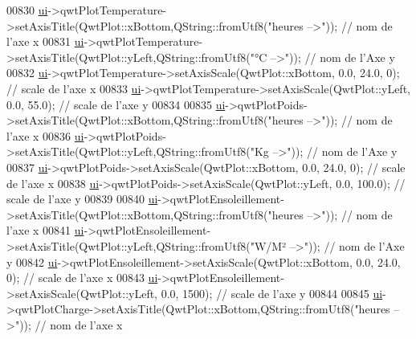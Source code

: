\begin{DoxyCode}
{00830     \hyperlink{class_ruche_ihm_a64786058bd7f88ca2f1e9743bb27c25b}{ui}->qwtPlotTemperature->setAxisTitle(QwtPlot::xBottom,QString::fromUtf8(\textcolor{stringliteral}{"heures -->"})); \textcolor{comment}{// nom de
       l'axe x}
00831     \hyperlink{class_ruche_ihm_a64786058bd7f88ca2f1e9743bb27c25b}{ui}->qwtPlotTemperature->setAxisTitle(QwtPlot::yLeft,QString::fromUtf8(\textcolor{stringliteral}{"°C -->"})); \textcolor{comment}{// nom de l'Axe y}
00832     \hyperlink{class_ruche_ihm_a64786058bd7f88ca2f1e9743bb27c25b}{ui}->qwtPlotTemperature->setAxisScale(QwtPlot::xBottom, 0.0, 24.0, 0); \textcolor{comment}{// scale de l'axe x}
00833     \hyperlink{class_ruche_ihm_a64786058bd7f88ca2f1e9743bb27c25b}{ui}->qwtPlotTemperature->setAxisScale(QwtPlot::yLeft, 0.0, 55.0); \textcolor{comment}{// scale de l'axe y}
00834 
00835     \hyperlink{class_ruche_ihm_a64786058bd7f88ca2f1e9743bb27c25b}{ui}->qwtPlotPoids->setAxisTitle(QwtPlot::xBottom,QString::fromUtf8(\textcolor{stringliteral}{"heures -->"})); \textcolor{comment}{// nom de l'axe x}
00836     \hyperlink{class_ruche_ihm_a64786058bd7f88ca2f1e9743bb27c25b}{ui}->qwtPlotPoids->setAxisTitle(QwtPlot::yLeft,QString::fromUtf8(\textcolor{stringliteral}{"Kg -->"})); \textcolor{comment}{// nom de l'Axe y}
00837     \hyperlink{class_ruche_ihm_a64786058bd7f88ca2f1e9743bb27c25b}{ui}->qwtPlotPoids->setAxisScale(QwtPlot::xBottom, 0.0, 24.0, 0); \textcolor{comment}{// scale de l'axe x}
00838     \hyperlink{class_ruche_ihm_a64786058bd7f88ca2f1e9743bb27c25b}{ui}->qwtPlotPoids->setAxisScale(QwtPlot::yLeft, 0.0, 100.0); \textcolor{comment}{// scale de l'axe y}
00839 
00840     \hyperlink{class_ruche_ihm_a64786058bd7f88ca2f1e9743bb27c25b}{ui}->qwtPlotEnsoleillement->setAxisTitle(QwtPlot::xBottom,QString::fromUtf8(\textcolor{stringliteral}{"heures -->"})); \textcolor{comment}{// nom de
       l'axe x}
00841     \hyperlink{class_ruche_ihm_a64786058bd7f88ca2f1e9743bb27c25b}{ui}->qwtPlotEnsoleillement->setAxisTitle(QwtPlot::yLeft,QString::fromUtf8(\textcolor{stringliteral}{"W/M² -->"})); \textcolor{comment}{// nom de
       l'Axe y}
00842     \hyperlink{class_ruche_ihm_a64786058bd7f88ca2f1e9743bb27c25b}{ui}->qwtPlotEnsoleillement->setAxisScale(QwtPlot::xBottom, 0.0, 24.0, 0); \textcolor{comment}{// scale de l'axe x}
00843     \hyperlink{class_ruche_ihm_a64786058bd7f88ca2f1e9743bb27c25b}{ui}->qwtPlotEnsoleillement->setAxisScale(QwtPlot::yLeft, 0.0, 1500); \textcolor{comment}{// scale de l'axe y}
00844 
00845     \hyperlink{class_ruche_ihm_a64786058bd7f88ca2f1e9743bb27c25b}{ui}->qwtPlotCharge->setAxisTitle(QwtPlot::xBottom,QString::fromUtf8(\textcolor{stringliteral}{"heures -->"})); \textcolor{comment}{// nom de l'axe x}
}
\end{DoxyCode}
